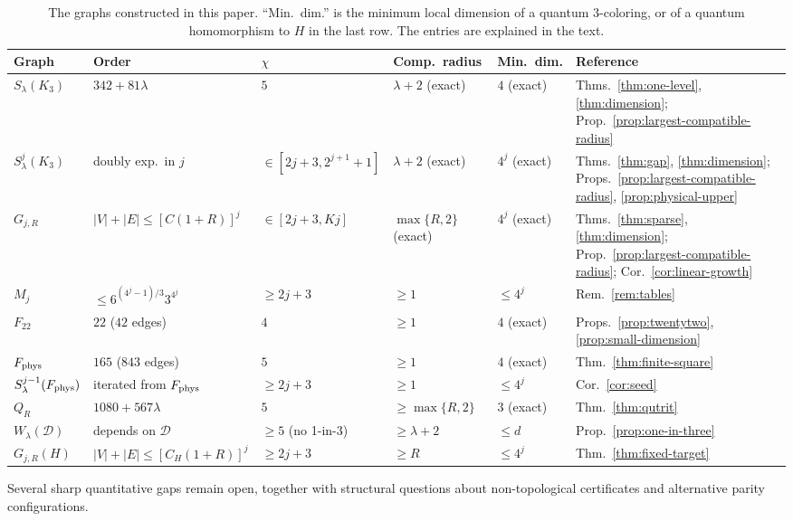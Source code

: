\begin{table}[htbp]
\centering
\scriptsize
\setlength{\tabcolsep}{3pt}
\begin{tabular}{@{}lllll>{\raggedright\arraybackslash}p{2.55cm}@{}}
\toprule
Graph & Order & $\chi$ & Comp.\ radius & Min.\ dim. & Reference \\
\midrule
$S_\lambda(K_3)$ & $342+81\lambda$ & $5$ & $\lambda+2$ (exact) & $4$ (exact) & Thms.~\ref{thm:one-level}, \ref{thm:dimension}; Prop.~\ref{prop:largest-compatible-radius} \\
$S^j_\lambda(K_3)$ & doubly exp.\ in $j$ & $\in[2j+3,2^{j+1}+1]$ & $\lambda+2$ (exact) & $4^j$ (exact) & Thms.~\ref{thm:gap}, \ref{thm:dimension}; Props.~\ref{prop:largest-compatible-radius}, \ref{prop:physical-upper} \\
$G_{j,R}$ & $|V|+|E|\le[C(1+R)]^j$ & $\in[2j+3,Kj]$ & $\max\{R,2\}$ (exact) & $4^j$ (exact) & Thms.~\ref{thm:sparse}, \ref{thm:dimension}; Prop.~\ref{prop:largest-compatible-radius}; Cor.~\ref{cor:linear-growth} \\
$M_j$ & $\le6^{(4^j-1)/3}3^{4^j}$ & $\ge2j+3$ & $\ge1$ & $\le4^j$ & Rem.~\ref{rem:tables} \\
$F_{22}$ & $22$ ($42$ edges) & $4$ & $\ge1$ & $4$ (exact) & Props.~\ref{prop:twentytwo}, \ref{prop:small-dimension} \\
$F_{\rm phys}$ & $165$ ($843$ edges) & $5$ & $\ge1$ & $4$ (exact) & Thm.~\ref{thm:finite-square} \\
$S^{j-1}_\lambda(F_{\rm phys})$ & iterated from $F_{\rm phys}$ & $\ge2j+3$ & $\ge1$ & $\le4^j$ & Cor.~\ref{cor:seed} \\
$Q_R$ & $1080+567\lambda$ & $5$ & $\ge\max\{R,2\}$ & $3$ (exact) & Thm.~\ref{thm:qutrit} \\
$W_\lambda(\mathcal D)$ & depends on $\mathcal D$ & $\ge5$ (no 1-in-3) & $\ge\lambda+2$ & $\le d$ & Prop.~\ref{prop:one-in-three} \\
$G_{j,R}(H)$ & $|V|+|E|\le[C_H(1+R)]^j$ & $\ge2j+3$ & $\ge R$ & $\le4^j$ & Thm.~\ref{thm:fixed-target} \\
\bottomrule
\end{tabular}
\caption{The graphs constructed in this paper. ``Min.\ dim.'' is the minimum local dimension of a quantum $3$-coloring, or of a quantum homomorphism to $H$ in the last row. The entries are explained in the text.}
\label{tab:graphs}
\end{table}

Several sharp quantitative gaps remain open, together with structural questions about non-topological certificates and alternative parity configurations.


